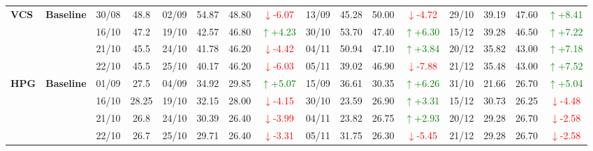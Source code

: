 {\begin{longtable}{llcc|cccc|cccc|cccc}
\multirow{4}{*}{\textbf{VCS}}
& \textbf{Baseline}
& 30/08 & 48.8 & 02/09 & 54.87 & 48.80 & \textcolor{red}{\(\downarrow\)-6.07} & 13/09 & 45.28 & 50.00 & \textcolor{red}{\(\downarrow\)-4.72} & 29/10 & 39.19 & 47.60 & \textcolor{green}{\(\uparrow\)+8.41} \\
& & 16/10 & 47.2 & 19/10 & 42.57 & 46.80 & \textcolor{green}{\(\uparrow\)+4.23} & 30/10 & 53.70 & 47.40 & \textcolor{green}{\(\uparrow\)+6.30} & 15/12 & 39.28 & 46.50 & \textcolor{green}{\(\uparrow\)+7.22} \\
& & 21/10 & 45.5 & 24/10 & 41.78 & 46.20 & \textcolor{red}{\(\downarrow\)-4.42} & 04/11 & 50.94 & 47.10 & \textcolor{green}{\(\uparrow\)+3.84} & 20/12 & 35.82 & 43.00 & \textcolor{green}{\(\uparrow\)+7.18} \\
& & 22/10 & 45.5 & 25/10 & 40.17 & 46.20 & \textcolor{red}{\(\downarrow\)-6.03} & 05/11 & 39.02 & 46.90 & \textcolor{red}{\(\downarrow\)-7.88} & 21/12 & 35.48 & 43.00 & \textcolor{green}{\(\uparrow\)+7.52} \\
\midrule

\multirow{4}{*}{\textbf{HPG}}
& \textbf{Baseline}
& 01/09 & 27.5 & 04/09 & 34.92 & 29.85 & \textcolor{green}{\(\uparrow\)+5.07} & 15/09 & 36.61 & 30.35 & \textcolor{green}{\(\uparrow\)+6.26} & 31/10 & 21.66 & 26.70 & \textcolor{green}{\(\uparrow\)+5.04} \\
& & 16/10 & 28.25 & 19/10 & 32.15 & 28.00 & \textcolor{red}{\(\downarrow\)-4.15} & 30/10 & 23.59 & 26.90 & \textcolor{green}{\(\uparrow\)+3.31} & 15/12 & 30.73 & 26.25 & \textcolor{red}{\(\downarrow\)-4.48} \\
& & 21/10 & 26.8 & 24/10 & 30.39 & 26.40 & \textcolor{red}{\(\downarrow\)-3.99} & 04/11 & 23.82 & 26.75 & \textcolor{green}{\(\uparrow\)+2.93} & 20/12 & 29.28 & 26.70 & \textcolor{red}{\(\downarrow\)-2.58} \\
& & 22/10 & 26.7 & 25/10 & 29.71 & 26.40 & \textcolor{red}{\(\downarrow\)-3.31} & 05/11 & 31.75 & 26.30 & \textcolor{red}{\(\downarrow\)-5.45} & 21/12 & 29.28 & 26.70 & \textcolor{red}{\(\downarrow\)-2.58} \\
\midrule


\end{longtable}}
